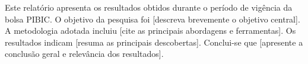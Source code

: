 
Este relatório apresenta os resultados obtidos durante o período de vigência da bolsa PIBIC.
O objetivo da pesquisa foi [descreva brevemente o objetivo central].
A metodologia adotada incluiu [cite as principais abordagens e ferramentas].
Os resultados indicam [resuma as principais descobertas].
Conclui-se que [apresente a conclusão geral e relevância dos resultados].